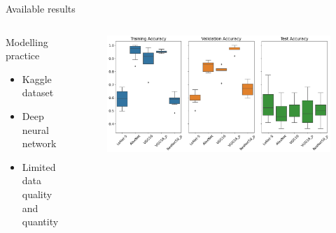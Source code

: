 \documentclass[aspectratio=169]{beamer}
\begin{document}
\begin{frame}{Available results}
    \pause
    \begin{columns}[T]
        \begin{column}{0.45\textwidth}
            Modelling practice
            \begin{itemize}
                \item Kaggle dataset
                \item Deep neural network
                \item Limited data quality and quantity
            \end{itemize}
        \end{column}
        \begin{column}{0.45\textwidth}
            \begin{figure}[H]
                \centering
                \includegraphics[height=0.4\textheight]{./tex_images/bootstrap_results.png}
            \end{figure}
        \end{column}
    \end{columns}
    \pause


\end{frame}
\end{document}
